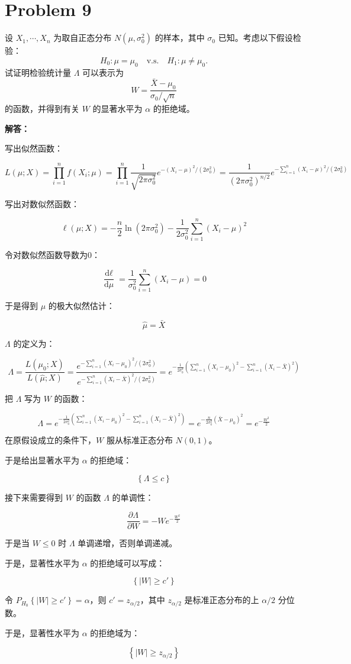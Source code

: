\documentclass[12pt,a4paper]{article}
\begin{document}
\section{Problem 9}

设 $X_1,\cdots,X_n$ 为取自正态分布 $N(\mu,\sigma_0^2)$ 的样本，其中 $\sigma_0$ 已知。考虑以下假设检验：
\[
  H_0:\mu=\mu_0\quad \text{v.s.}\quad H_1:\mu\ne\mu_0.
\]
试证明检验统计量 $\Lambda$ 可以表示为
\[
  W=\frac{\bar{X}-\mu_0}{\sigma_0/\sqrt{n}}
\]
的函数，并得到有关 $W$ 的显著水平为 $\alpha$ 的拒绝域。

\begin{answerbox}
\textbf{解答：}

写出似然函数：

$$
L(\mu; X) = \prod_{i=1}^n f(X_i; \mu) = \prod_{i=1}^n \frac{1}{\sqrt{2\pi \sigma_0^2}} e^{-(X_i-\mu)^2/(2\sigma_0^2)} = \frac{1}{(2\pi \sigma_0^2)^{n/2}} e^{-\sum_{i=1}^n (X_i-\mu)^2/(2\sigma_0^2)}
$$

写出对数似然函数：

$$
\ell(\mu; X) = -\frac{n}{2} \ln (2\pi \sigma_0^2) - \frac{1}{2\sigma_0^2} \sum_{i=1}^n (X_i-\mu)^2
$$

令对数似然函数导数为0：

$$
\frac{\text{d}\ell}{\text{d}\mu} = \frac{1}{\sigma_0^2} \sum_{i=1}^n (X_i - \mu) = 0
$$

于是得到 $\mu$ 的极大似然估计：

$$
\hat{\mu} = \bar{X}
$$

$\Lambda$ 的定义为：

$$
\Lambda = \frac{L(\mu_0; X)}{L(\hat{\mu}; X)} = \frac{e^{-\sum_{i=1}^n (X_i-\mu_0)^2/(2\sigma_0^2)}}{e^{-\sum_{i=1}^n (X_i-\bar{X})^2/(2\sigma_0^2)}} = e^{-\frac{1}{2\sigma_0^2} \left( \sum_{i=1}^n (X_i-\mu_0)^2 - \sum_{i=1}^n (X_i-\bar{X})^2 \right)}
$$

把 $\Lambda$ 写为 $W$ 的函数：

$$
\Lambda = e^{-\frac{1}{2\sigma_0^2} \left( \sum_{i=1}^n (X_i-\mu_0)^2 - \sum_{i=1}^n (X_i-\bar{X})^2 \right)} = e^{-\frac{n}{2\sigma_0^2} (\bar{X}-\mu_0)^2} = e^{-\frac{W^2}{2}}
$$

在原假设成立的条件下，$W$ 服从标准正态分布 $N(0,1)$。

于是给出显著水平为 $\alpha$ 的拒绝域：

$$
\left\{\Lambda \leq c\right\}
$$

接下来需要得到 $W$ 的函数 $\Lambda$ 的单调性：

$$
\frac{\partial \Lambda}{\partial W} = -W e^{-\frac{W^2}{2}}
$$

于是当 $W \leq 0$ 时 $\Lambda$ 单调递增，否则单调递减。

于是，显著性水平为 $\alpha$ 的拒绝域可以写成：

$$
\left\{|W| \geq c'\right\}
$$

令 $P_{H_0}\left\{|W| \geq c'\right\} = \alpha$，则 $c' = z_{\alpha/2}$，其中 $z_{\alpha/2}$ 是标准正态分布的上 $\alpha/2$ 分位数。

于是，显著性水平为 $\alpha$ 的拒绝域为：

$$
\left\{|W| \geq z_{\alpha/2}\right\}
$$

\end{answerbox}
\end{document}
